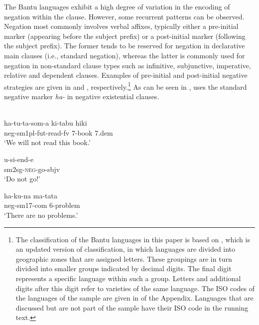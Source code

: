 \documentclass[output=paper,draft,draftmode,colorlinks,citecolor=brown]{langscibook}
\begin{document}
The Bantu languages exhibit a high degree of variation in the encoding of
negation within the clause. However, some recurrent patterns can be
observed. Negation most commonly involves verbal affixes, typically either
a pre-initial marker (appearing before the subject prefix) or a
post-initial marker (following the subject prefix). The former tends to be
reserved for negation in declarative main clauses (i.e., standard negation),
whereas the latter is commonly used for negation in non-standard clause
types such as infinitive, subjunctive, imperative, relative and dependent
clauses. Examples of pre-initial and post-initial negative strategies are
given in  and ,
respectively.\footnote{The classification of the Bantu languages in this
paper is based on \citet{Maho2009}, which is an updated
version of  classification, in
which languages are divided into geographic zones that are assigned
letters. These groupings are in turn divided into smaller groups indicated
by decimal digits. The final digit represents a specific language
within such a group. Letters and additional digits after this digit refer
to varieties of the same language. The ISO codes of the languages of the
sample are given in  of the Appendix. Languages that are
discussed but are not part of the sample have their ISO code in the running
text.} As can be seen in ,  uses the
standard negative marker {\it ha-} in negative existential clauses.

\ea\label{ex:swahili-read-go-problem} \\

\ea\label{ex:swahili-read}
    \gll ha-tu-ta-som-a ki-tabu hiki\\
    {\sc neg-sm1pl}-{\sc fut}-read-{\sc fv} 7-book 7.{\sc dem}\\

\glt `We will not read this book.'

    \ex\label{ex:swahili-go}
    \gll u-si-end-e\\
    {\sc sm2sg}-\textsc{neg}-go-{\sc sbjv}\\

\glt `Do not go!'

    \ex\label{ex:swahili-problem}
    \gll ha-ku-na ma-tata\\
    {\sc neg-sm17-com} 6-problem\\

\glt `There are no problems.'
    \z
\z
\end{document}

